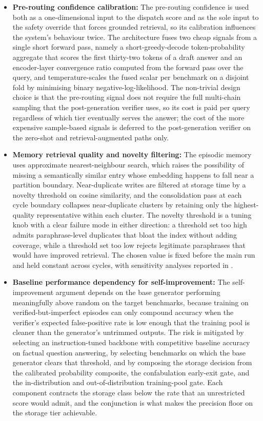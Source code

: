 \begin{itemize}
    \item \textbf{Pre-routing confidence calibration:} The pre-routing confidence is used both as a one-dimensional input to the dispatch score and as the sole input to the safety override that forces grounded retrieval, so its calibration influences the system's behaviour twice. The architecture fuses two cheap signals from a single short forward pass, namely a short-greedy-decode token-probability aggregate that scores the first thirty-two tokens of a draft answer and an encoder-layer convergence ratio computed from the forward pass over the query, and temperature-scales the fused scalar per benchmark on a disjoint fold by minimising binary negative-log-likelihood. The non-trivial design choice is that the pre-routing signal does not require the full multi-chain sampling that the post-generation verifier uses, so its cost is paid per query regardless of which tier eventually serves the answer; the cost of the more expensive sample-based signals is deferred to the post-generation verifier on the zero-shot and retrieval-augmented paths only.

    \item \textbf{Memory retrieval quality and novelty filtering:} The episodic memory uses approximate nearest-neighbour search, which raises the possibility of missing a semantically similar entry whose embedding happens to fall near a partition boundary. Near-duplicate writes are filtered at storage time by a novelty threshold on cosine similarity, and the consolidation pass at each cycle boundary collapses near-duplicate clusters by retaining only the highest-quality representative within each cluster. The novelty threshold is a tuning knob with a clear failure mode in either direction: a threshold set too high admits paraphrase-level duplicates that bloat the index without adding coverage, while a threshold set too low rejects legitimate paraphrases that would have improved retrieval. The chosen value is fixed before the main run and held constant across cycles, with sensitivity analyses reported in .

    \item \textbf{Baseline performance dependency for self-improvement:} The self-improvement argument depends on the base generator performing meaningfully above random on the target benchmarks, because training on verified-but-imperfect episodes can only compound accuracy when the verifier's expected false-positive rate is low enough that the training pool is cleaner than the generator's untrimmed outputs. The risk is mitigated by selecting an instruction-tuned backbone with competitive baseline accuracy on factual question answering, by selecting benchmarks on which the base generator clears that threshold, and by composing the storage decision from the calibrated probability composite, the confabulation early-exit gate, and the in-distribution and out-of-distribution training-pool gate. Each component contracts the storage class below the rate that an unrestricted score would admit, and the conjunction is what makes the precision floor on the storage tier achievable.


\end{itemize}
